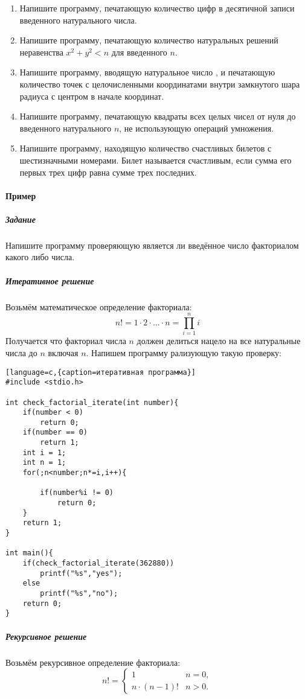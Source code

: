 \documentclass[a4paper,12pt]{article}
\begin{document}
\begin{enumerate}
	\item Напишите программу, печатающую количество цифр в десятичной записи введенного натурального числа.
	\item Напишите программу, печатающую количество натуральных решений неравенства $x^{2}+y^{2}<n$ для введенного $n$.
	\item Напишите программу, вводящую натуральное число , и печатающую количество точек с целочисленными координатами внутри замкнутого шара радиуса с центром в начале координат.
	\item Напишите программу, печатающую квадраты всех целых чисел от нуля до введенного натурального $n$, не использующую операций умножения.
	\item Напишите программу, находящую количество счастливых билетов с шестизначными номерами. Билет называется счастливым, если сумма его первых трех цифр равна сумме трех последних.
\end{enumerate}

\paragraph{Пример}
\subparagraph{Задание}
Напишите программу проверяющую является ли введённое число факториалом какого либо числа.
\subparagraph{Итеративное решение}
Возьмём математическое определение факториала:
\begin{equation}
n! = 1\cdot 2\cdot\ldots\cdot n =\prod_{i=1}^n i
\end{equation}
Получается что факториал числа $n$ должен делиться нацело на все натуральные числа до $n$ включая $n$. Напишем программу рализующую такую проверку:

\begin{lstlisting}[language=c,{caption=итеративная программа}]
#include <stdio.h>

int check_factorial_iterate(int number){
	if(number < 0) 
		return 0;
	if(number == 0) 
		return 1;
	int i = 1;
	int n = 1;
	for(;n<number;n*=i,i++){
		
		if(number%i != 0)
			return 0;
	}
	return 1;
}

int main(){
	if(check_factorial_iterate(362880))
		printf("%s","yes");
	else
		printf("%s","no");
	return 0;
}
\end{lstlisting}

\subparagraph{Рекурсивное решение}
Возьмём рекурсивное определение факториала:
\begin{equation}
n!= \begin{cases}
1 & n = 0,\\
n \cdot (n-1)! & n > 0.
\end{cases}
\end{equation}
\end{document}
